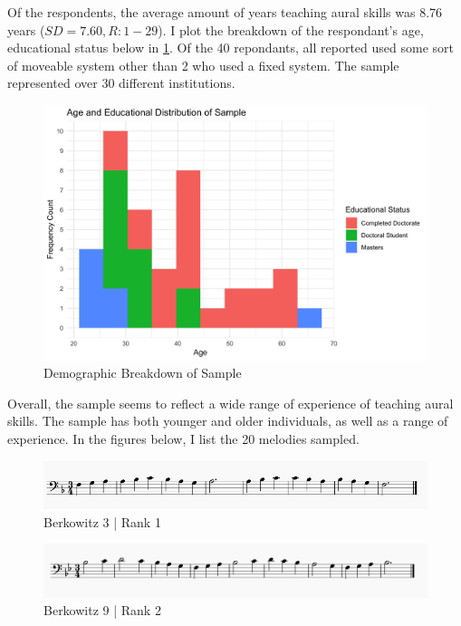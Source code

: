 \documentclass[]{book}
\begin{document}
Of the respondents, the average amount of years teaching aural skills was 8.76 years (\(SD = 7.60, R: 1-29\)).
I plot the breakdown of the respondant's age, educational status below in \ref{fig:surveyageeducation}.
Of the 40 repondants, all reported used some sort of moveable system other than 2 who used a fixed system.
The sample represented over 30 different institutions.

\begin{figure}

{\centering \includegraphics[width=0.8\linewidth]{img/age_ed_survey_distribution} 

}

\caption{Demographic Breakdown of Sample}\label{fig:surveyageeducation}
\end{figure}

Overall, the sample seems to reflect a wide range of experience of teaching aural skills.
The sample has both younger and older individuals, as well as a range of experience.
In the figures below, I list the 20 melodies sampled.

\begin{figure}

{\centering \includegraphics[width=1\linewidth]{img/survey_melodies/Berkowitz3} 

}

\caption{Berkowitz 3 | Rank 1}\label{fig:berk3}
\end{figure}

\begin{figure}

{\centering \includegraphics[width=1\linewidth]{img/survey_melodies/Berkowitz9} 

}

\caption{Berkowitz 9 | Rank 2}\label{fig:berk9}
\end{figure}
\end{document}
